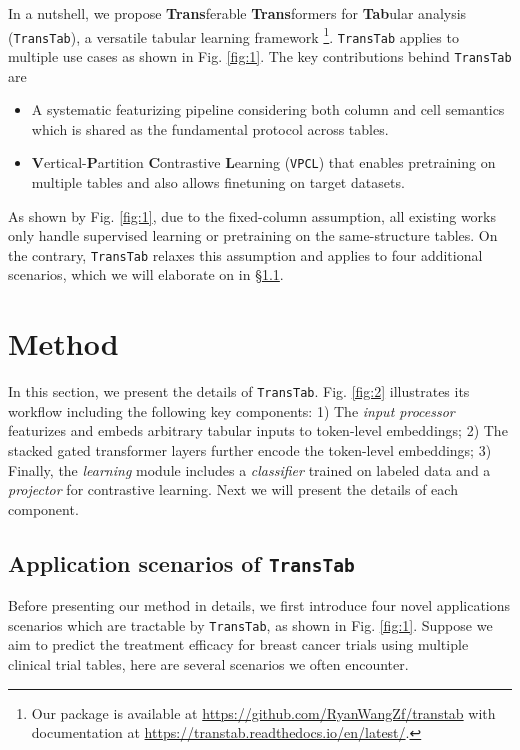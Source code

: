 In a nutshell, we propose \textbf{Trans}ferable \textbf{Trans}formers for \textbf{Tab}ular analysis (\texttt{TransTab}), a versatile tabular learning framework \footnote{Our package is available at \url{https://github.com/RyanWangZf/transtab} with documentation at \url{https://transtab.readthedocs.io/en/latest/}.}. \texttt{TransTab} applies to multiple use cases as shown in Fig. \ref{fig:1}. 
The key contributions behind \texttt{TransTab} are

\begin{itemize}[leftmargin=*, itemsep=0pt, labelsep=5pt]
\item A systematic featurizing pipeline considering both column and cell semantics which is shared as the fundamental protocol across tables.
\item \textbf{V}ertical-\textbf{P}artition \textbf{C}ontrastive \textbf{L}earning (\texttt{VPCL}) that enables pretraining on multiple tables and also allows finetuning on target datasets.
\end{itemize}

As shown by Fig. \ref{fig:1}, due to the fixed-column assumption, all existing works only handle supervised learning or pretraining on the same-structure tables. On the contrary, \texttt{TransTab} relaxes this assumption and applies to four additional scenarios, which we will elaborate on in \S \ref{sec:inference}. 

\section{Method}
In this section, we present the details of \texttt{TransTab}. Fig. \ref{fig:2} illustrates its workflow including the following key components: 1) The \textit{input processor} featurizes and embeds arbitrary tabular inputs to token-level embeddings; 2) The stacked gated transformer layers further encode the token-level embeddings; 3) Finally, the {\it learning} module includes a  {\it classifier} trained on labeled data and a {\it projector} for contrastive learning. Next we will present the details of each component.

\subsection{Application scenarios of \texttt{TransTab}} \label{sec:inference}
Before presenting our method in details, we first introduce four novel applications scenarios which are tractable by \texttt{TransTab}, as shown in Fig. \ref{fig:1}. Suppose we aim to predict the treatment efficacy for breast cancer trials using multiple clinical trial tables, here are several scenarios we often encounter.

